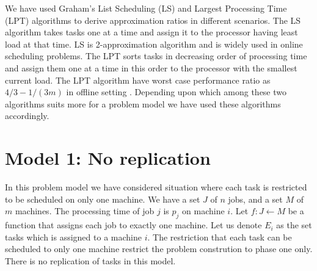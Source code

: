 \documentclass[10pt, conference, compsocconf]{IEEEtran}
\begin{document}
We have used  Graham's List Scheduling (LS) and Largest Processing Time (LPT) algorithms to derive approximation ratios in different scenarios. The LS algorithm takes tasks one at a time and assign  it to the processor having least load at that time. LS is 2-approximation algorithm and is widely used in online scheduling problems.  The LPT sorts tasks in decreasing order of processing time and assign them one at a time in this order to the processor with the smallest current load. The LPT algorithm have worst case performance ratio as $4/3-1/(3m) $ in offline setting
. Depending upon which among these two algorithms suits more for a problem model we have used these algorithms accordingly. 

\section{Model 1: No replication} 
In this problem model we have considered  situation where each task is restricted to be scheduled on only one machine.  We have a set $J$ of $ n$ jobs, and a set $M$ of $m$ machines. The processing time of job $j$ is $p_{j}$ on machine $i$. Let $f : J \leftarrow M$ be a function that assigns each job to exactly one machine. Let us denote $E_{i}$ as the set tasks which is assigned to a machine $i$.  The restriction that each task can be scheduled to only one machine restrict the problem constrution to phase one only. There is no replication of tasks in this model.\\
\\
\end{document}
